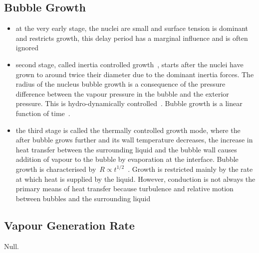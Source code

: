 \documentclass[11pt]{article}
\begin{document}
\subsection{Bubble Growth}
\begin{itemize}
	\item at the very early stage, the nuclei are small and surface tension is dominant and restricts growth, this delay period has a marginal influence and is often ignored~\cite{miyatakeSimpleUniversalEquation1997, liaoFlashingEvaporationDifferent2013}
	\item second stage, called inertia controlled growth~\cite{Gartner2024-zh}, starts after the nuclei have grown to around twice their diameter due to the dominant inertia forces. The radius of the nucleus bubble growth is a consequence of the pressure difference between the vapour pressure in the bubble and the exterior pressure. This is hydro-dynamically controlled~\cite{liaoFlashingEvaporationDifferent2013}. Bubble growth is a linear function of time~\cite{miyatakeSimpleUniversalEquation1997}.
	\item the third stage is called the thermally controlled growth mode, where the after bubble grows further and its wall temperature decreases, the increase in heat transfer between the surrounding liquid and the bubble wall causes addition of vapour to the bubble by evaporation at the interface. Bubble growth is characterised by~$R \propto t^{1/2}$~\cite{miyatakeSimpleUniversalEquation1997}. Growth is restricted mainly by the rate at which heat is supplied by the liquid. However, conduction is not always the primary means of heat transfer because turbulence and relative motion between bubbles and the surrounding liquid~\cite{liaoComputationalModellingFlash2017}
\end{itemize}
\subsection{Vapour Generation Rate}
Null.
\end{document}
